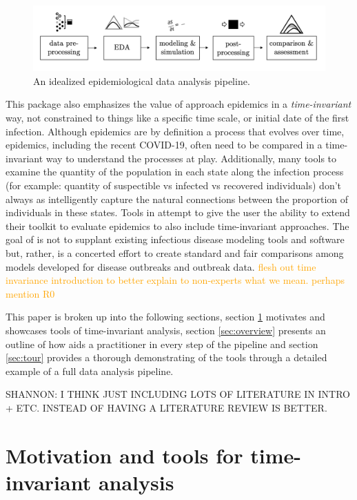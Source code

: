 \documentclass[
  shortnames]{jss}
\begin{document}
\begin{figure}[!ht]
    \centering
    \includegraphics[width = 1\textwidth]{images/pipeline1.png}
    \caption{An idealized epidemiological data analysis pipeline.}
    \label{fig:pipeline}
\end{figure}

This package also emphasizes the value of approach epidemics in a
\textit{time-invariant} way, not constrained to things like a specific
time scale, or initial date of the first infection. Although epidemics
are by definition a process that evolves over time, epidemics, including
the recent COVID-19, often need to be compared in a time-invariant way
to understand the processes at play. Additionally, many tools to examine
the quantity of the population in each state along the infection process
(for example: quantity of suspectible vs infected vs recovered
individuals) don't always as intelligently capture the natural
connections between the proportion of individuals in these states. Tools
in  attempt to give the user the ability to extend their
toolkit to evaluate epidemics to also include time-invariant approaches.
The goal of  is not to supplant existing infectious
disease modeling tools and software but, rather, is a concerted effort
to create standard and fair comparisons among models developed for
disease outbreaks and outbreak data.
\textcolor{orange}{flesh out time invariance introduction to better explain to non-experts what we mean.  perhaps mention R0}

This paper is broken up into the following sections, section
\ref{sec:time-invariant} motivates and showcases tools of time-invariant
analysis, section \ref{sec:overview} presents an outline of how
 aids a practitioner in every step of the pipeline and
section \ref{sec:tour} provides a thorough demonstrating of the tools
through a detailed example of a full data analysis pipeline.

SHANNON: I THINK JUST INCLUDING LOTS OF LITERATURE IN INTRO + ETC.
INSTEAD OF HAVING A LITERATURE REVIEW IS BETTER.

\section[Time-invariant]{Motivation and tools for time-invariant
analysis}\label{sec:time-invariant}
\end{document}

